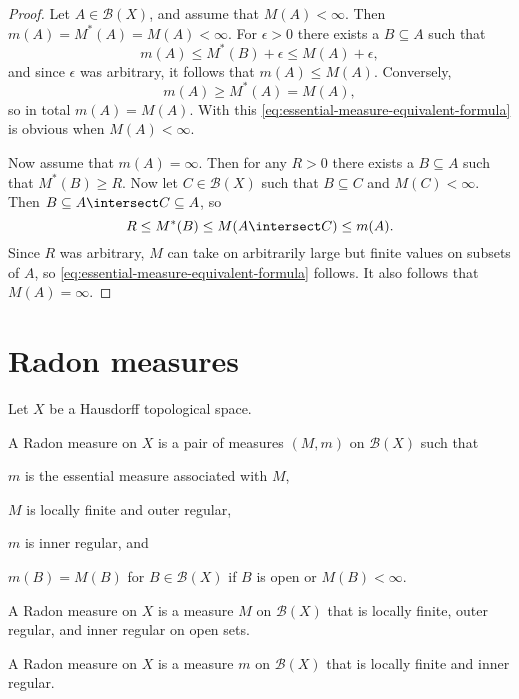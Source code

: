 \documentclass[article, a4paper, 11pt, oneside]{memoir}
\numberwithin{equation}{chapter}
\newcommand{\calB}{\mathcal{B}}
\newcommand{\borel}[1]{\calB(#1)}
\begin{document}
\begin{proof}
    Let $A \in \borel{X}$, and assume that $M(A) < \infty$. Then $m(A) = M^*(A) = M(A) < \infty$. For $\epsilon > 0$ there exists a $B \subseteq A$ such that
    \begin{equation*}
        m(A)
            \leq M^*(B) + \epsilon
            \leq M(A) + \epsilon,
    \end{equation*}
    and since $\epsilon$ was arbitrary, it follows that $m(A) \leq M(A)$. Conversely,
    \begin{equation*}
        m(A)
            \geq M^*(A)
            = M(A),
    \end{equation*}
    so in total $m(A) = M(A)$. With this \eqref{eq:essential-measure-equivalent-formula} is obvious when $M(A) < \infty$.

    Now assume that $m(A) = \infty$. Then for any $R > 0$ there exists a $B \subseteq A$ such that $M^*(B) \geq R$. Now let $C \in \borel{X}$ such that $B \subseteq C$ and $M(C) < \infty$. Then $B \subseteq A \intersect C \subseteq A$, so
    \begin{equation*}
        R
            \leq M^*(B)
            \leq M(A \intersect C)
            \leq m(A).
    \end{equation*}
    Since $R$ was arbitrary, $M$ can take on arbitrarily large but finite values on subsets of $A$, so \eqref{eq:essential-measure-equivalent-formula} follows. It also follows that $M(A) = \infty$.
\end{proof}


\chapter{Radon measures}

Let $X$ be a Hausdorff topological space.

\begin{definition}
    A Radon measure on $X$ is a pair of measures $(M,m)$ on $\borel{X}$ such that
    \begin{enumdef}
        \item $m$ is the essential measure associated with $M$,

        \item $M$ is locally finite and outer regular,

        \item $m$ is inner regular, and

        \item $m(B) = M(B)$ for $B \in \borel{X}$ if $B$ is open or $M(B) < \infty$.
    \end{enumdef}
\end{definition}

\begin{definition}
    A Radon measure on $X$ is a measure $M$ on $\borel{X}$ that is locally finite, outer regular, and inner regular on open sets.
\end{definition}

\begin{definition}
    A Radon measure on $X$ is a measure $m$ on $\borel{X}$ that is locally finite and inner regular.
\end{definition}
\end{document}
